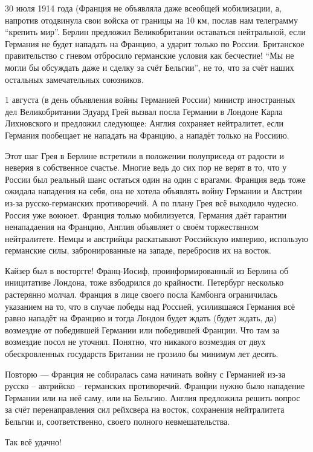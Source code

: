 30 июля 1914 года (Франция не объявляла даже всеобщей мобилизации, а, напротив
отодвинула свои войска от границы на 10 км, послав нам телеграмму
\enquote{крепить мир}. Берлин предложил Великобритании оставаться нейтральной, если
Германия не будет нападать на Францию, а ударит только по России. Британское
правительство с гневом отбросило германские условия как бесчестие! \enquote{Мы
не могли бы обсуждать даже и сделку за счёт Бельгии}, не то, что за счёт наших
остальных замечательных союзников.

1 августа (в день объявления войны Германией России) министр иностранных дел
Великобритании Эдуард Грей вызвал посла Германии в Лондоне Карла Лихновского и
предложил следующее: Англия сохраняет нейтралитет, если Германия пообещает не
нападать на Францию, а нападёт только на Россиию.

Этот шаг Грея в Берлине встретили в положении полуприседа от радости и неверия
в собственное счастье. Многие ведь до сих пор не верят в то, что у России был
реальный шанс остаться один на один с врагами. Франция ведь тоже ожидала
нападения на себя, она не хотела объявлять войну Германии и Австрии из-за
русско-германских противоречий. А по плану Грея всё выходило чудесно. Россия
уже воююет. Франция только мобилизуется, Германия даёт гарантии ненападаения на
Францию, Англия объявляет о своём торжествнном нейтралитете. Немцы и австрийцы
раскатывают Российскую империю, использую германские силы, забронированные на
западе, перебросив их на восток.

Кайзер был в восторгге! Франц-Иосиф, проинформированный из Берлина об
иницитативе Лондона, тоже взбодрился до крайности. Петербург несколько
растерянно молчал. Франция в лице своего посла Камбонга ограничилась указанием
на то, что в случае победы над Россией, усилившаяся Германия всё равно нападёт
на Францию и тогда Лондон будет ждать (будет ждать, да) возмездие от победившей
Германии или победившей Франции. Что там за возмездие посол не уточнял. Понятно,
что никакого возмездия от двух обескровленных государств Британии не грозило бы
минимум лет десять.

Повторю  --- Франция не собиралась сама начинать войну с Германией из-за
русско -- автрийско -- германских противоречий. Франции нужно было нападение
Германии или на неё саму, или на Бельгию. Англия предложила решить вопрос за
счёт перенаправления сил рейхсвера на восток, сохранения нейтралитета Бельгии
и, соответственно, своего полного невмешательства.

\vspace{1ex}\noindent
Так всё удачно!
\vspace{1ex}


